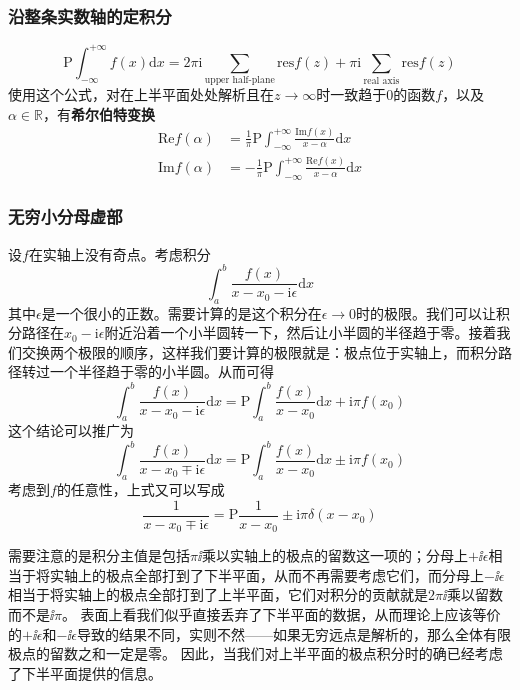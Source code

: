 \documentclass[UTF8]{ctexart}
\newcommand*{\reals}{\mathbb{R}}
\begin{document}
\hypertarget{ux6cbfux6574ux6761ux5b9eux6570ux8f74ux7684ux5b9aux79efux5206}{%
\subsubsection{沿整条实数轴的定积分}\label{ux6cbfux6574ux6761ux5b9eux6570ux8f74ux7684ux5b9aux79efux5206}}

\[
\mathrm{P} \int_{-\infty}^{+\infty} f(x) \mathrm{d}x = 2 \pi  \mathrm{i} \sum_{\text{upper half-plane}} \mathrm{res} f(z) + \pi \mathrm{i} \sum_{\text{real axis}} \mathrm{res} f(z)
\]
使用这个公式，对在上半平面处处解析且在$z \to \infty$时一致趋于0的函数$f$，以及$\alpha \in \reals$，有\textbf{希尔伯特变换}
\[
\begin{aligned}
    \mathrm{Re} f(\alpha) &= \frac{1}{\pi} \mathrm{P} \int_{-\infty}^{+\infty} \frac{\mathrm{Im} f(x)}{x - \alpha} \mathrm{d} x \\
    \mathrm{Im} f(\alpha) &= - \frac{1}{\pi} \mathrm{P} \int_{-\infty}^{+\infty} \frac{\mathrm{Re} f(x)}{x - \alpha} \mathrm{d} x 
\end{aligned}
\]

\hypertarget{ux65e0ux7a77ux5c0fux5206ux6bcdux865aux90e8}{%
\subsubsection{无穷小分母虚部}\label{ux65e0ux7a77ux5c0fux5206ux6bcdux865aux90e8}}

设$f$在实轴上没有奇点。考虑积分 \[
\int_a^b \frac{f(x)}{x-x_0 - \mathrm{i}\epsilon} \mathrm{d}x
\]
其中$\epsilon$是一个很小的正数。需要计算的是这个积分在$\epsilon\to 0$时的极限。我们可以让积分路径在$x_0 - \mathrm{i}\epsilon$附近沿着一个小半圆转一下，然后让小半圆的半径趋于零。接着我们交换两个极限的顺序，这样我们要计算的极限就是：极点位于实轴上，而积分路径转过一个半径趋于零的小半圆。从而可得
\[
\int_a^b \frac{f(x)}{x-x_0 - \mathrm{i}\epsilon} \mathrm{d}x = \mathrm{P} \int_a^b \frac{f(x)}{x-x_0} \mathrm{d}x + \mathrm{i} \pi f(x_0)
\] 这个结论可以推广为 \[
\int_a^b \frac{f(x)}{x-x_0 \mp \mathrm{i}\epsilon} \mathrm{d}x = \mathrm{P} \int_a^b \frac{f(x)}{x-x_0} \mathrm{d}x \pm \mathrm{i} \pi f(x_0)
\] 考虑到$f$的任意性，上式又可以写成 \[
\frac{1}{x - x_0 \mp \mathrm{i}\epsilon} = \mathrm{P} \frac{1}{x - x_0} \pm \mathrm{i} \pi \delta(x - x_0)
\]

需要注意的是积分主值是包括$\pi \ii$乘以实轴上的极点的留数这一项的；分母上$+\ii \epsilon$相当于将实轴上的极点全部打到了下半平面，从而不再需要考虑它们，而分母上$- \ii \epsilon$相当于将实轴上的极点全部打到了上半平面，它们对积分的贡献就是$2\pi \ii$乘以留数而不是$\ii \pi$。
表面上看我们似乎直接丢弃了下半平面的数据，从而理论上应该等价的$+ \ii \epsilon$和$- \ii \epsilon$导致的结果不同，实则不然——如果无穷远点是解析的，那么全体有限极点的留数之和一定是零。
因此，当我们对上半平面的极点积分时的确已经考虑了下半平面提供的信息。
\end{document}

